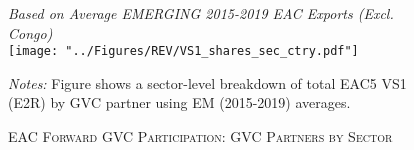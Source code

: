 \documentclass[a4paper]{article}
\begin{document}
\begin{figure}[h!] \vspace{-1mm}
\centering
\caption{\label{fig:EACVS1_ctry_sec}\textsc{EAC Forward GVC Participation: GVC Partners by Sector}}
\small{\textit{Based on Average EMERGING 2015-2019 EAC Exports (Excl. Congo)}} \\
\vspace{1mm}
\texttt{[image: "../Figures/REV/VS1\_shares\_sec\_ctry.pdf"]} \\ %
\raggedright
\scriptsize
\vspace{-1mm}
\emph{Notes:} Figure shows a sector-level breakdown of total EAC5 VS1 (E2R) by GVC partner using EM (2015-2019) averages. \\ \vspace{-3mm}
\end{figure}
\FloatBarrier


\end{document}

